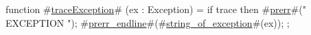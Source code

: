 function #\hyperref[ztraceException]{traceException}# (ex : Exception) = {
  if trace then {
    #\hyperref[zprerr]{prerr}#(" EXCEPTION ");
    #\hyperref[zprerrzyendline]{prerr\_endline}#(#\hyperref[zstringzyofzyexception]{string\_of\_exception}#(ex));
  };
}
